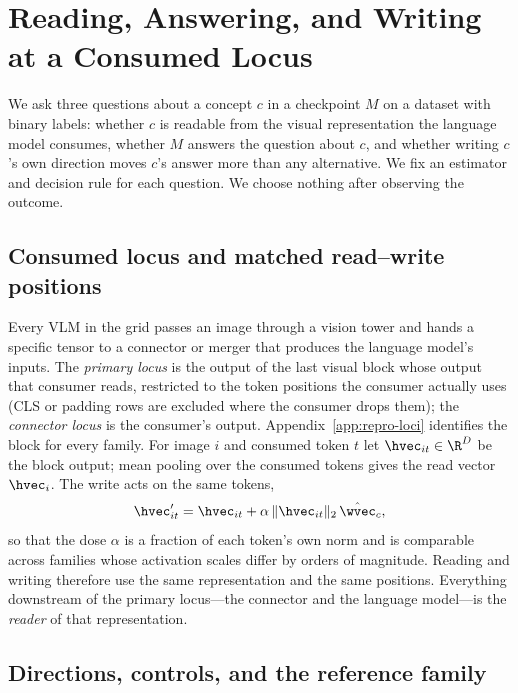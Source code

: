 \section{Reading, Answering, and Writing at a Consumed Locus}
\label{sec:framework}

We ask three questions about a concept $c$ in a checkpoint $M$ on a dataset with binary labels: whether $c$ is readable from the visual representation the language model consumes, whether $M$ answers the question about $c$, and whether writing $c$'s own direction moves $c$'s answer more than any alternative. We fix an estimator and decision rule for each question. We choose nothing after observing the outcome.

\subsection{Consumed locus and matched read--write positions}
\label{sec:locus}

Every VLM in the grid passes an image through a vision tower and hands a specific tensor to a connector or merger that produces the language model's inputs. The \emph{primary locus} is the output of the last visual block whose output that consumer reads, restricted to the token positions the consumer actually uses (CLS or padding rows are excluded where the consumer drops them); the \emph{connector locus} is the consumer's output. Appendix~\ref{app:repro-loci} identifies the block for every family. For image $i$ and consumed token $t$ let $\hvec_{it}\in\R^D$ be the block output; mean pooling over the consumed tokens gives the read vector $\hvec_i$. The write acts on the same tokens,
\begin{equation}
\hvec'_{it}=\hvec_{it}+\alpha\,\lVert\hvec_{it}\rVert_2\,\hat\wvec_c,
\label{eq:intervention}
\end{equation}
so that the dose $\alpha$ is a fraction of each token's own norm and is comparable across families whose activation scales differ by orders of magnitude. Reading and writing therefore use the same representation and the same positions. Everything downstream of the primary locus---the connector and the language model---is the \emph{reader} of that representation.

\subsection{Directions, controls, and the reference family}
\label{sec:directions}

